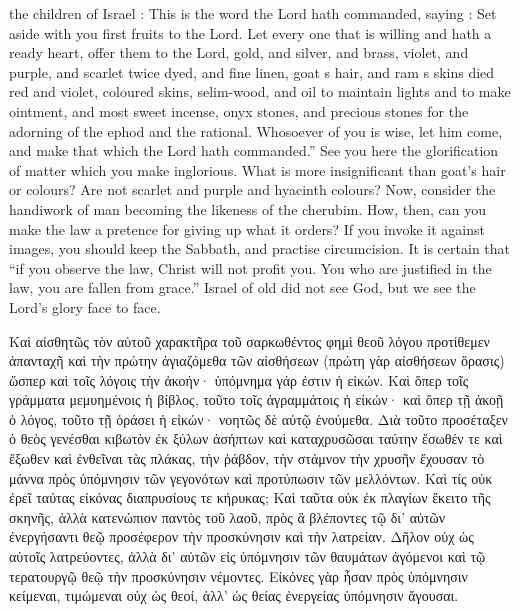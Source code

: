\documentclass[10pt]{book}
\newcommand{\switchGreek}[1][]{\selectlanguage{polutonikogreek} \switchcolumn*[#1]}
\newcommand{\switchEnglish}{\selectlanguage{english} \switchcolumn}
\begin{document}
\begin{paracol}{2}
the children of Israel : This is the word the 
Lord hath commanded, saying : Set aside with 
you first fruits to the Lord. Let every one 
that is willing and hath a ready heart, offer 
them to the Lord, gold, and silver, and brass, 
violet, and purple, and scarlet twice dyed, and 
fine linen, goat s hair, and ram s skins died red 
and violet, coloured skins, selim-wood, and oil 
to maintain lights and to make ointment, and 
most sweet incense, onyx stones, and precious 
stones for the adorning of the ephod and the 
rational. Whosoever of you is wise, let him 
come, and make that which the Lord hath 
commanded.'' See you here the glorification 
of matter which you make inglorious. What 
is more insignificant than goat's hair or colours? 
Are not scarlet and purple and hyacinth colours? 
Now, consider the handiwork of man becoming 
the likeness of the cherubim. How, then, can 
you make the law a pretence for giving up 
what it orders? If you invoke it against 
images, you should keep the Sabbath, and 
practise circumcision. It is certain that ``if 
you observe the law, Christ will not profit 
you. You who are justified in the law, you 
are fallen from grace.'' Israel of old did not see 
God, but we see the Lord's glory face to face. 

\switchGreek

Καὶ αἰσθητῶς τὸν αὐτοῦ χαρακτῆρα τοῦ σαρκωθέντος φημὶ θεοῦ λόγου προτίθεμεν ἁπανταχῆ καὶ τὴν πρώτην ἁγιαζόμεθα τῶν αἰσθήσεων (πρώτη γὰρ αἰσθήσεων ὅρασις) ὥσπερ καὶ τοῖς λόγοις τὴν ἀκοήν· ὑπόμνημα γάρ ἐστιν ἡ εἰκών. Καὶ ὅπερ τοῖς γράμματα μεμυημένοις ἡ βίβλος, τοῦτο τοῖς ἀγραμμάτοις ἡ εἰκών· καὶ ὅπερ τῇ ἀκοῇ ὁ λόγος, τοῦτο τῇ ὁράσει ἡ εἰκών· νοητῶς δὲ αὐτῷ ἑνούμεθα. Διὰ τοῦτο προσέταξεν ὁ θεὸς γενέσθαι κιβωτὸν ἐκ ξύλων ἀσήπτων καὶ καταχρυσῶσαι ταύτην ἔσωθέν τε καὶ ἔξωθεν καὶ ἐνθεῖναι τὰς πλάκας, τὴν ῥάβδον, τὴν στάμνον τὴν χρυσῆν ἔχουσαν τὸ μάννα πρὸς ὑπόμνησιν τῶν γεγονότων καὶ προτύπωσιν τῶν μελλόντων. Καὶ τίς οὐκ ἐρεῖ ταύτας εἰκόνας διαπρυσίους τε κήρυκας; Καὶ ταῦτα οὐκ ἐκ πλαγίων ἔκειτο τῆς σκηνῆς, ἀλλὰ κατενώπιον παντὸς τοῦ λαοῦ, πρὸς ἃ βλέποντες τῷ δι’ αὐτῶν ἐνεργήσαντι θεῷ προσέφερον τὴν προσκύνησιν καὶ τὴν λατρείαν. Δῆλον οὐχ ὡς αὐτοῖς λατρεύοντες, ἀλλὰ δι’ αὐτῶν εἰς ὑπόμνησιν τῶν θαυμάτων ἀγόμενοι καὶ τῷ τερατουργῷ θεῷ τὴν προσκύνησιν νέμοντες. Εἰκόνες γὰρ ἦσαν πρὸς ὑπόμνησιν κείμεναι, τιμώμεναι οὐχ ὡς θεοί, ἀλλ’ ὡς θείας ἐνεργείας ὑπόμνησιν ἄγουσαι.

\switchEnglish


\end{paracol}
\end{document}
